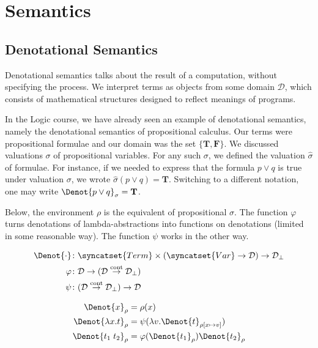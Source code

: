 \usetikzlibrary{shapes}

\chapter{Semantics}

\section{Denotational Semantics}

Denotational semantics talks about the result of a computation, without specifying the process. We interpret terms as objects from some domain $\mathcal{D}$, which consists of mathematical structures designed to reflect meanings of programs. 

In the Logic course, we have already seen an example of denotational semantics, namely the denotational semantics of propositional calculus. Our terms were propositional formulae and our domain was the set $\{ \mathbf{T}, \mathbf{F} \}$. We discussed valuations $\sigma$ of propositional variables. For any such $\sigma$, we defined the valuation $\hat{\sigma}$ of formulae. For instance, if we needed to express that the formula $p \lor q$ is true under valuation $\sigma$, we wrote $\hat{\sigma}(p \lor q) = \mathbf{T}$. Switching to a different notation, one may write $\Denot{p \lor q}_\sigma = \mathbf{T}$.

Below, the environment $\rho$ is the equivalent of propositional $\sigma$. The function $\varphi$ turns denotations of lambda-abstractions into functions on denotations (limited in some reasonable way). The function $\psi$ works in the other way.

\begin{align*}
\Denot{\cdot} &\colon
  \syncatset{Term} \times (\syncatset{Var} \rightarrow \mathcal{D})
    \rightarrow \mathcal{D}_{\bot} \\
\varphi &\colon \mathcal{D} \rightarrow (\mathcal{D} \stackrel{\text{cont}}{\rightarrow} \mathcal{D}_\bot) \\
\psi &\colon (\mathcal{D} \stackrel{\text{cont}}{\rightarrow} \mathcal{D}_\bot) \rightarrow \mathcal{D}
\end{align*}

\begin{alignat*}{2}
  \Denot{x}_\rho & = \rho(x) \\
  \Denot{\lambda x.t}_\rho & =
    \psi(\mathbf{\lambda} v. \Denot{t}_{\rho [x \mapsto v]}) \\
  \Denot{t_1 \; t_2}_\rho & =
    \varphi(\Denot{t_1}_\rho) \Denot{t_2}_\rho
\end{alignat*}


